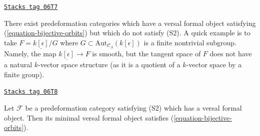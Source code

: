 \begin{example}
\label{formal-defos-example-do-not-get-S2}
\href{https://stacks.math.columbia.edu/tag/06T7}{\texttt{Stacks tag 06T7}}

There exist predeformation categories which have a versal formal
object satisfying (\ref{equation-bijective-orbits}) but which do not
satisfy (S2). A quick example is to take $F = \underline{k[\epsilon]}/G$
where $G \subset \text{Aut}_{\mathcal{C}_\Lambda}(k[\epsilon])$
is a finite nontrivial subgroup. Namely, the map
$\underline{k[\epsilon]} \to F$ is smooth, but the tangent space
of $F$ does not have a natural $k$-vector space structure (as it is
a quotient of a $k$-vector space by a finite group).
\end{example}

\begin{lemma}
\label{formal-defos-lemma-construct-bijective-orbits}
\href{https://stacks.math.columbia.edu/tag/06T8}{\texttt{Stacks tag 06T8}}

Let $\mathcal{F}$ be a predeformation category satisfying
(S2) which has a versal formal object. Then its minimal versal
formal object satisfies (\ref{equation-bijective-orbits}).
\end{lemma}

